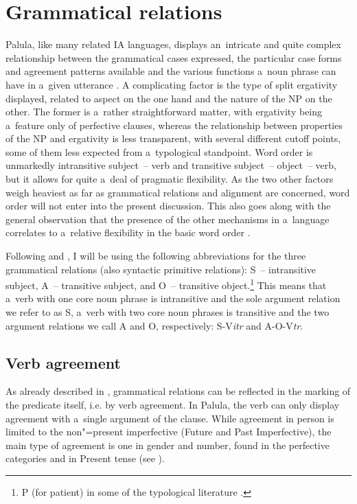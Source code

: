 \chapter{Grammatical relations}
\label{chap:11}

Palula, like many related IA languages, displays an~intricate and quite complex relationship between the grammatical cases expressed, the particular case forms and agreement patterns available and the various functions a~noun phrase can have in a~given utterance \citep[230--231]{masica1991}. A complicating factor is the type of split ergativity displayed, related to aspect on the one hand and the nature of the NP on the other. The former is a~rather straightforward matter, with ergativity being a~feature only of perfective clauses, whereas the relationship between properties of the NP and ergativity is less transparent, with several different cutoff points, some of them less expected from a~typological standpoint. Word order is unmarkedly intransitive subject~-- verb and transitive subject~-- object~-- verb, but it allows for quite a~deal of pragmatic flexibility. As the two other factors weigh heaviest as far as grammatical relations and alignment are concerned, word order will not enter into the present discussion. This also goes along with the general observation that the presence of the other mechanisms in a~language correlates to a~relative flexibility in the basic word order \citep[15]{blake1994}.



Following \citet[6--8]{dixon1994} and \citet[110--116]{comrie1989}, I will be using the following abbreviations for the three grammatical relations (also syntactic primitive relations): S~-- intransitive subject, A~-- transitive subject, and O~-- transitive object.\footnote{P (for patient) in some of the typological literature \citep{comrie1989,croft1990}.\par } This means that a~verb with one core noun phrase is intransitive and the sole argument relation we refer to as S, a~verb with two core noun phrases is transitive and the two argument relations we call A and O, respectively: S-V\textit{itr} and A-O-V\textit{tr}.


\section{Verb agreement}
\label{sec:11-1}

As already described in , grammatical relations can be reflected in the marking of the predicate itself, i.e. by verb agreement. In Palula, the verb can only display agreement with a~single argument of the clause. While agreement in person is limited to the non"=present imperfective (Future and Past Imperfective), the main type of agreement is one in gender and number, found in the perfective categories and in Present tense (see ). 



